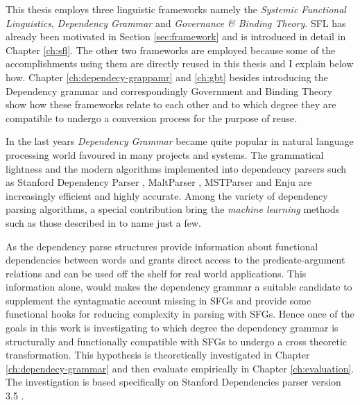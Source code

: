 %
This thesis employs three linguistic frameworks namely the \textit{Systemic Functional Linguistics}, \textit{Dependency Grammar} and \textit{Governance \& Binding Theory}. SFL has already been motivated in Section \ref{sec:framework} and is introduced in detail in Chapter \ref{ch:sfl}. The other two frameworks are employed because some of the accomplishments using them are directly reused in this thesis and I explain below how. Chapter \ref{ch:dependecy-grappamr} and \ref{ch:gbt} besides introducing the Dependency grammar and correspondingly Government and Binding Theory show how these frameworks relate to each other and to which degree they are compatible to undergo a conversion process for the purpose of reuse.


%
In the last years \textit{Dependency Grammar} \citep{Tesniere2015} became quite popular in natural language processing world favoured in many projects and systems. The grammatical lightness and the  modern algorithms implemented into dependency parsers such as Stanford Dependency Parser \citep{Marneffe2006}, MaltParser \citep{Nivre2006}, MSTParser \citep{McDonald2006} and Enju \citep{Miyao2005} are increasingly efficient and highly accurate. Among the variety of dependency parsing algorithms, a special contribution bring the \textit{machine learning} methods such as those described in \citet{mcdonald2005online, mcdonald2006online, carreras2007experiments, zhang2011transition, pei2015effective} to name just a few. 

As the dependency parse structures provide information about functional dependencies between words and grants direct access to the predicate-argument relations and can be used off the shelf for real world applications. 
This information alone, would makes the dependency grammar a suitable candidate to supplement the syntagmatic account missing in SFGs and provide some functional hooks for reducing complexity in parsing with SFGs. Hence once of the goals in this work is investigating to which degree the dependency grammar is structurally and functionally compatible with SFGs to undergo a cross theoretic transformation. This hypothesis is theoretically investigated in Chapter \ref{ch:dependecy-grammar} and then evaluate empirically in Chapter \ref{ch:evaluation}. The investigation is based specifically on Stanford Dependencies parser version 3.5 \citep{Marneffe2008a,Marneffe2008, Marneffe2014}. 

